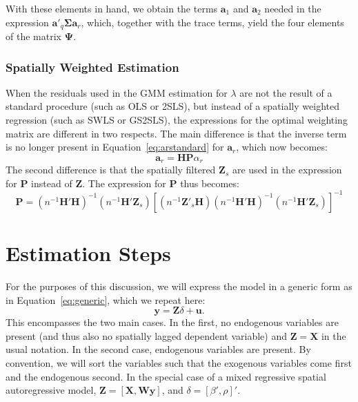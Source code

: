 \documentclass{article}
\begin{document}
With these elements in hand, we obtain the terms $\mathbf{a}_1$ and $\mathbf{a}_2$ needed
in the expression $\mathbf{a'}_q \mathbf{\Sigma} \mathbf{a}_r$, which, together with the trace
terms, yield the four elements of the matrix $\mathbf{\Psi}$.

\subsubsection{Spatially Weighted Estimation}\label{ss:weightsfilter}
When the residuals used in the GMM estimation for $\lambda$ are not the result of a standard
procedure (such as OLS or 2SLS), but instead of a spatially weighted regression (such as
SWLS or GS2SLS), the expressions for the optimal weighting matrix are different in two
respects. The main difference is that the inverse term is no longer present in
Equation~\ref{eq:arstandard} for $\mathbf{a}_r$, which now becomes:
\begin{equation}\label{eq:arweighted}
\mathbf{a}_r = \mathbf{HP} \alpha_r
\end{equation}
The second difference is that the spatially filtered $\mathbf{Z}_s$ are used in the
expression for $\mathbf{P}$ instead of $\mathbf{Z}$. The expression for $\mathbf{P}$
thus becomes:
\begin{equation}\label{eq:filteredP}
\mathbf{P} = (n^{-1}\mathbf{H'H})^{-1} ( n^{-1} \mathbf{H'Z}_s ) 
        [ (n^{-1} \mathbf{Z'}_s \mathbf{H} ) (n^{-1} \mathbf{H'H} )^{-1} (n^{-1} \mathbf{H'Z}_s) ]^{-1}
\end{equation}

\section{Estimation Steps}
For the purposes of this discussion, we will express the model in a generic form as
in Equation~\ref{eq:generic}, which we repeat here:
\begin{equation*}
\mathbf{y} = \mathbf{Z} \delta + \mathbf{u}.
\end{equation*}
This encompasses the two main cases. In the first, no endogenous variables
are present (and thus also no spatially lagged dependent variable) and 
$\mathbf{Z} = \mathbf{X}$ in the usual notation. In the second case, endogenous
variables are present. By convention, we will sort the variables such that the
exogenous variables come first and the endogenous second. In the special
case of a mixed regressive spatial autoregressive model, $\mathbf{Z} = [ \mathbf{X}, \mathbf{Wy} ]$,
and $\delta = [ \beta', \rho]'$.
\end{document}
